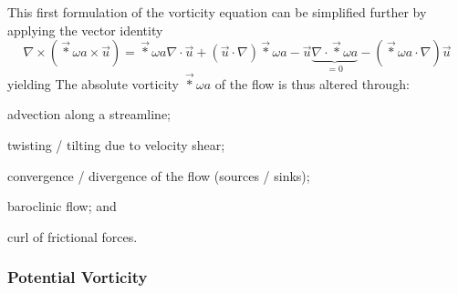 This first formulation of the vorticity equation can be simplified further by applying the vector identity
%
\begin{equation}
\nabla\times(\vec*{\omega}{a}\times\vec{u}) = \vec*{\omega}{a}\nabla\cdot\vec{u} + (\vec{u}\cdot\nabla)\vec*{\omega}{a} - \vec{u} \underbrace{\nabla\cdot\vec*{\omega}{a}}_{=0} - (\vec*{\omega}{a}\cdot\nabla)\vec{u}
\end{equation}
%
yielding
%
%
The absolute vorticity \(\vec*{\omega}{a}\) of the flow is thus altered through:
\begin{renum}
\item advection along a streamline;
\item twisting / tilting due to velocity shear;
\item convergence / divergence of the flow (sources / sinks);
\item baroclinic flow; and
\item curl of frictional forces.
\end{renum}

\subsubsection{Potential Vorticity}

